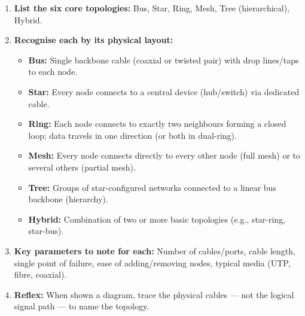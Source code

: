 \documentclass[11pt]{article}
\begin{document}
\begin{methode}
\begin{enumerate}
\item \textbf{List the six core topologies:} Bus, Star, Ring, Mesh, Tree (hierarchical), Hybrid.
\item \textbf{Recognise each by its physical layout:}
      \begin{itemize}
      \item \textbf{Bus:} Single backbone cable (coaxial or twisted pair) with drop lines/taps to each node.
      \item \textbf{Star:} Every node connects to a central device (hub/switch) via dedicated cable.
      \item \textbf{Ring:} Each node connects to exactly two neighbours forming a closed loop; data travels in one direction (or both in dual-ring).
      \item \textbf{Mesh:} Every node connects directly to every other node (full mesh) or to several others (partial mesh).
      \item \textbf{Tree:} Groups of star-configured networks connected to a linear bus backbone (hierarchy).
      \item \textbf{Hybrid:} Combination of two or more basic topologies (e.g., star-ring, star-bus).
      \end{itemize}
\item \textbf{Key parameters to note for each:} Number of cables/ports, cable length, single point of failure, ease of adding/removing nodes, typical media (UTP, fibre, coaxial).
\item \textbf{Reflex:} When shown a diagram, trace the physical cables — not the logical signal path — to name the topology.
\end{enumerate}
\end{methode}
\end{document}
